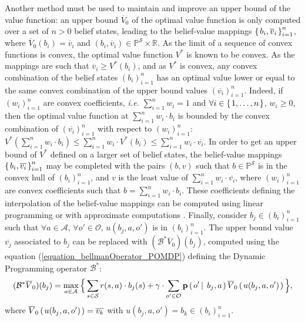Another method must be used to maintain and improve an upper bound 
of the value function: 
an upper bound $\overline{V}_0$ of the optimal value function is only
computed over a set of $n>0$ belief states,
leading to the belief-value mappings 
$\left\{ \left.  b_i, \overline{v}_i  \right. \right\}_{i=1}^{n}$,
where $\overline{V}_0(b_i) = \overline{v}_i$
and $(b_i,\overline{v}_i) \in \mathbb{P}^{\mathcal{S}} \times \mathbb{R}$.
As the limit of a sequence of convex functions
is convex, the optimal value function $V^*$ is known to be convex.
As the mappings are such that $\overline{v}_i \geqslant V^*(b_i)$, 
and as $V^*$ is convex, any convex combination of the belief states $(b_i)_{i=1}^n$
has an optimal value lower or equal to the same convex combination of the upper bound values $(\overline{v_i})_{i=1}^n$.
Indeed, if $(w_i)_{i=1}^n$ are convex coefficients, \textit{i.e.} 
$\sum_{i=1}^n w_i = 1$ and $\forall i \in \left\{ \left. 1,\ldots,n \right. \right\}$, $w_i\geqslant 0$,
then the optimal value function at $\sum_{i=1}^n w_i \cdot b_i$ 
is bounded by the convex combination of $(\overline{v_i})_{i=1}^n$
with respect to $(w_i)_{i=1}^n$: $V^*(\sum_{i=1}^n w_i \cdot b_i) \leqslant \sum_{i=1}^n w_i \cdot V^*(b_i) \leqslant \sum_{i=1}^n w_i \cdot \overline{v_i}$.
In order to get an upper bound of $V^*$ defined on a larger set of belief states, 
the belief-value mappings $\left\{ \left.  b_i, \overline{v_i}  \right. \right\}_{i=1}^n$
may be completed with the pairs $(b,v)$ such that
$b \in \mathbb{P}^{\mathcal{S}}$ is in the convex hull of $(b_i)_{i=1}^{n}$,
and $v$ is the least value of $\sum_{i=1}^n w_i \cdot \overline{v_i}$,
where $(w_i)_{i=1}^n$ are convex coefficients such that $b = \sum_{i=1}^n w_i \cdot b_i$.
These coefficients defining the interpolation of the belief-value mappings 
can be computed using linear programming
or with approximate computations 
\cite{DBLP:journals/corr/abs-1106-0234,conf/aips/PoupartKK11}.
Finally, consider $b_j \in (b_i)_{i=1}^n$ 
such that $\forall a \in \mathcal{A}$, $\forall o' \in \mathcal{O}$,
$u(b_j,a,o')$ is in $(b_i)_{i=1}^n$.
The upper bound value $\overline{v_j}$ associated to $b_j$ can be replaced with 
$(\mathcal{B}^* \overline{V}_0)(b_j)$, 
computed using the equation (\ref{equation_bellmanOperator_POMDP}) 
defining the Dynamic Programming operator $\mathcal{B}^*$:
\[ (\mathcal{B}^* \overline{V}_0)(b_j) = \max_{a \in \mathcal{A}} \Big\{ \sum_{s \in \mathcal{S}} r(s,a) \cdot b_j(s) + \gamma \cdot \sum_{o' \in \mathcal{O}} \textbf{p} \left( \left. o' \, \right| \left. \, b_j , a  \right. \right) \overline{V}_0 \left( \left.  u(b_j,a,o')   \right. \right) \Big\}, \]
where $\overline{V}_0 \left( \left.  u(b_j,a,o')   \right. \right) = \overline{v_k}$
with $u(b_j,a,o') = b_k \in (b_i)_{i=1}^n$.
